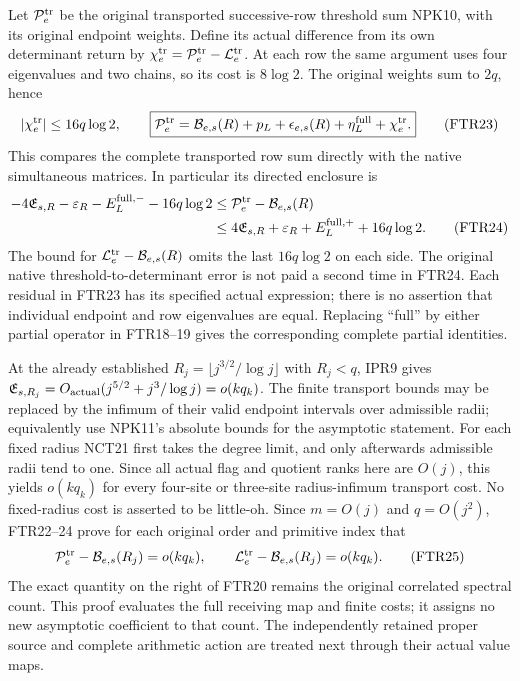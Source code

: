 Let $\mathcal P_e^{\rm tr}$ be the original transported successive-row
threshold sum NPK10, with its original endpoint weights. Define its
actual difference from its own determinant return by
$\chi_e^{\rm tr}=\mathcal P_e^{\rm tr}-\mathcal L_e^{\rm tr}$.
At each row the same argument uses four eigenvalues and two chains,
so its cost is $8\log2$. The original weights sum to $2q$, hence
\[
 |\chi_e^{\rm tr}|\le16q\log2,\qquad
 \boxed{\mathcal P_e^{\rm tr}
 =\mathcal B_{e,s}(R)+p_L+\epsilon_{e,s}(R)
                       +\eta_L^{\rm full}+\chi_e^{\rm tr}.}    \tag{FTR23}
\]
This compares the complete transported row sum directly with the
native simultaneous matrices. In particular its directed enclosure is
\[
\begin{split}
 -4\mathfrak E_{s,R}-\varepsilon_R-E_L^{\mathrm{full},-}
                       -16q\log2
 &\le \mathcal P_e^{\rm tr}-\mathcal B_{e,s}(R)\\
 &\le4\mathfrak E_{s,R}+\varepsilon_R+E_L^{\mathrm{full},+}
                       +16q\log2 .                      \tag{FTR24}
\end{split}
\]
The bound for $\mathcal L_e^{\rm tr}-\mathcal B_{e,s}(R)$
omits the last $16q\log2$ on each side. The original native
threshold-to-determinant error is not paid a second time in FTR24.
Each residual in FTR23 has its specified actual expression;
there is no assertion that individual endpoint and row eigenvalues
are equal. Replacing ``full'' by either partial operator in
FTR18--19 gives the corresponding complete partial identities.

At the already established $R_j=\lfloor j^{3/2}/\log j\rfloor$
with $R_j<q$, IPR9 gives
$\mathfrak E_{s,R_j}=O_{\rm actual}(j^{5/2}+j^3/\log j)
=o(kq_k)$. The finite transport bounds may be replaced by the
infimum of their valid endpoint intervals over admissible radii;
equivalently use NPK11's absolute bounds for the asymptotic statement.
For each fixed radius NCT21 first takes the degree limit, and only
afterwards admissible radii tend to one. Since all actual flag and
quotient ranks here are $O(j)$, this yields $o(kq_k)$ for every
four-site or three-site radius-infimum transport cost. No fixed-radius
cost is asserted to be little-oh. Since $m=O(j)$ and $q=O(j^2)$,
FTR22--24 prove for each original order and primitive index that
\[
 \mathcal P_e^{\rm tr}-\mathcal B_{e,s}(R_j)=o(kq_k),\qquad
 \mathcal L_e^{\rm tr}-\mathcal B_{e,s}(R_j)=o(kq_k).       \tag{FTR25}
\]
The exact quantity on the right of FTR20 remains the original
correlated spectral count. This proof evaluates the full receiving
map and finite costs; it assigns no new asymptotic coefficient to
that count. The independently retained proper source and complete
arithmetic action are treated next through their actual value maps.

